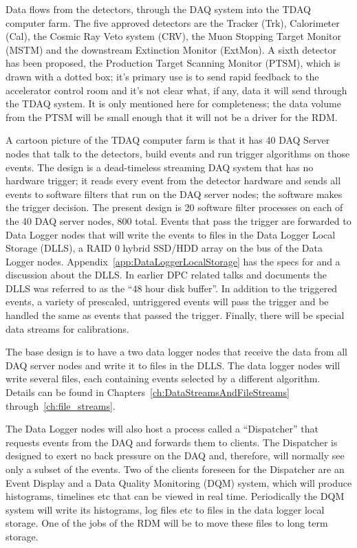 Data flows from the detectors, through the DAQ system into the TDAQ computer farm.
The five approved detectors are the Tracker (Trk), Calorimeter (Cal), the Cosmic Ray Veto system (CRV),
the Muon Stopping Target Monitor (MSTM) and the downstream Extinction Monitor (ExtMon).
A sixth detector has been proposed, the Production Target Scanning Monitor (PTSM),
which is drawn with a dotted box;
it's primary use is to send rapid feedback to the accelerator control room
and it's not clear what, if any, data it will send through the TDAQ system.
It is only mentioned here for completeness;
the data volume from the PTSM will be small enough that it will not be
a driver for the RDM.

A cartoon picture of the TDAQ computer farm is that it has 40 DAQ Server nodes
that talk to the detectors, build events and run trigger algorithms on those events.
The design is a dead-timeless streaming DAQ system that has no hardware trigger;
it reads every event from the detector hardware and sends all events to software filters
that run on the DAQ server nodes;
the software makes the trigger decision.
The present design is 20 software filter processes on each of the 40 DAQ server nodes, 800 total.
Events that pass the trigger are forwarded to Data Logger nodes that will write the events
to files in the Data Logger Local Storage (DLLS), a RAID 0 hybrid SSD/HDD array on the bus of the Data Logger nodes.
Appendix~\ref{app:DataLoggerLocalStorage} has the specs for and a discussion about the DLLS.
In earlier DPC related talks and documents the DLLS  was referred to as the ``48 hour disk buffer''.
In addition to the triggered events, a variety of prescaled, untriggered events will pass the
trigger and be handled the same as events that passed the trigger.
Finally, there will be special data streams for calibrations.

The base design is to have a two data logger nodes that receive the data from all DAQ server nodes
and write it to files in the DLLS.
The data logger nodes will write several files, each containing events selected by a different algorithm.
Details can be found in Chapters~\ref{ch:DataStreamsAndFileStreams} through~\ref{ch:file_streams}.

The Data Logger nodes will also host a process called a ``Dispatcher''
that requests events from the DAQ and forwards them to clients.
The Dispatcher is designed to exert no back pressure on the DAQ
and, therefore, will normally see only a subset of the events.
Two of the clients foreseen for the Dispatcher are an Event Display and
a Data Quality Monitoring (DQM) system,
which will produce histograms, timelines etc that can be viewed in real time.
Periodically the DQM system will write its histograms, log files etc to
files in the data logger local storage.  One of the jobs of the RDM will be
to move these files to long term storage.

